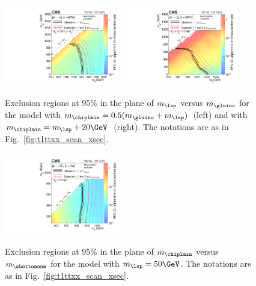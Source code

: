 \begin{figure}[!hbtp]
\centering
\includegraphics[width=0.45\textwidth]{figs/ssp/scan_t5qqqqww.pdf}
\includegraphics[width=0.45\textwidth]{figs/ssp/scan_t5qqqqwwdm20.pdf}
\caption{Exclusion regions at 95\% \CL in the plane of $m_{\lsp}$ versus $m_{\gluino}$ for the \TfqqqqWW model
with $m_{\chiplmin}=0.5(m_{\gluino} + m_{\lsp})$~(left) and with $m_{\chiplmin} = m_{\lsp} + 20\GeV$~(right).
The notations are as in Fig.~\ref{fig:t1ttxx_scan_xsec}.  }
\label{fig:t5qqqqww_scan_xsec}
\end{figure}




\begin{figure}[!hbtp]
\centering
\includegraphics[width=0.45\textwidth]{figs/ssp/scan_t6ttww.pdf}\\
\caption{ Exclusion regions at 95\% \CL in the plane of $m_{\chiplmin}$ versus $m_{\sbottomone}$ for the \TsttWW model with $m_{\lsp}=50\GeV$.
    The notations are as in Fig.~\ref{fig:t1ttxx_scan_xsec}. }
\label{fig:t6ttww_scan_xsec}
\end{figure}

